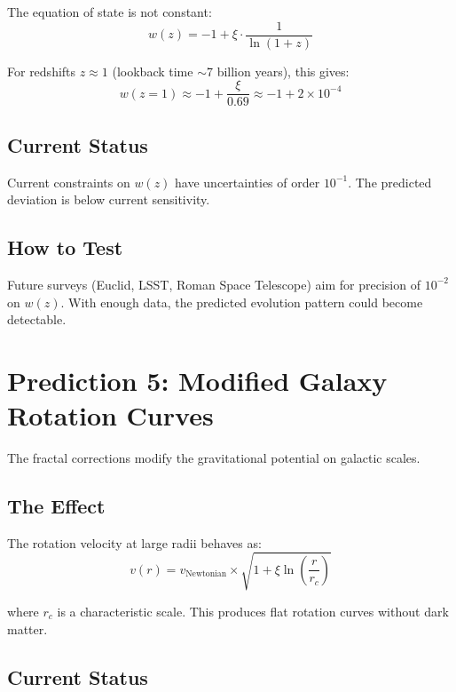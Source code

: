 The equation of state is not constant:
\begin{equation}
w(z) = -1 + \xi \cdot \frac{1}{\ln(1+z)}
\end{equation}

For redshifts $z \approx 1$ (lookback time $\sim$7 billion years), this gives:
\begin{equation}
w(z=1) \approx -1 + \frac{\xi}{0.69} \approx -1 + 2 \times 10^{-4}
\end{equation}

\subsection{Current Status}

Current constraints on $w(z)$ have uncertainties of order $10^{-1}$. The predicted deviation is below current sensitivity.

\subsection{How to Test}

Future surveys (Euclid, LSST, Roman Space Telescope) aim for precision of $10^{-2}$ on $w(z)$. With enough data, the predicted evolution pattern could become detectable.

\section{Prediction 5: Modified Galaxy Rotation Curves}

The fractal corrections modify the gravitational potential on galactic scales.

\subsection{The Effect}

The rotation velocity at large radii behaves as:
\begin{equation}
v(r) = v_{\text{Newtonian}} \times \sqrt{1 + \xi \ln\left(\frac{r}{r_c}\right)}
\end{equation}

where $r_c$ is a characteristic scale. This produces flat rotation curves without dark matter.

\subsection{Current Status}

